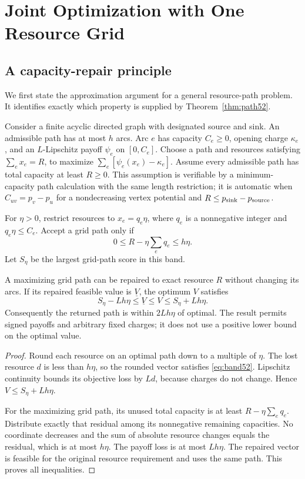 \section{Joint Optimization with One Resource Grid}\label{sec:algorithm52}
\subsection{A capacity-repair principle}
We first state the approximation argument for a general resource-path problem. It identifies exactly which property is supplied by Theorem~\ref{thm:path52}.

Consider a finite acyclic directed graph with designated source and sink. An admissible path has at most $h$ arcs. Arc $e$ has capacity $C_e\geq0$, opening charge $\kappa_e$, and an $L$-Lipschitz payoff $\psi_e$ on $[0,C_e]$. Choose a path and resources satisfying $\sum_e x_e=R$, to maximize $\sum_e[\psi_e(x_e)-\kappa_e]$. Assume every admissible path has total capacity at least $R\geq0$. This assumption is verifiable by a minimum-capacity path calculation with the same length restriction; it is automatic when $C_{uv}=p_v-p_u$ for a nondecreasing vertex potential and $R\leq p_{\rm sink}-p_{\rm source}$.

For $\eta>0$, restrict resources to $x_e=q_e\eta$, where $q_e$ is a nonnegative integer and $q_e\eta\leq C_e$. Accept a grid path only if
\begin{equation}\label{eq:band52}
 0\leq R-\eta\sum_e q_e\leq h\eta.
\end{equation}
Let $S_\eta$ be the largest grid-path score in this band.
\begin{theorem}\label{thm:repair52}
A maximizing grid path can be repaired to exact resource $R$ without changing its arcs. If its repaired feasible value is $\underline V$, the optimum $V$ satisfies
\begin{equation}\label{eq:generalcert52}
 S_\eta-Lh\eta\leq\underline V\leq V\leq S_\eta+Lh\eta.
\end{equation}
Consequently the returned path is within $2Lh\eta$ of optimal. The result permits signed payoffs and arbitrary fixed charges; it does not use a positive lower bound on the optimal value.
\end{theorem}
\begin{proof}
Round each resource on an optimal path down to a multiple of $\eta$. The lost resource $d$ is less than $h\eta$, so the rounded vector satisfies \eqref{eq:band52}. Lipschitz continuity bounds its objective loss by $Ld$, because charges do not change. Hence $V\leq S_\eta+Lh\eta$.

For the maximizing grid path, its unused total capacity is at least $R-\eta\sum_e q_e$. Distribute exactly that residual among its nonnegative remaining capacities. No coordinate decreases and the sum of absolute resource changes equals the residual, which is at most $h\eta$. The payoff loss is at most $Lh\eta$. The repaired vector is feasible for the original resource requirement and uses the same path. This proves all inequalities.
\end{proof}

